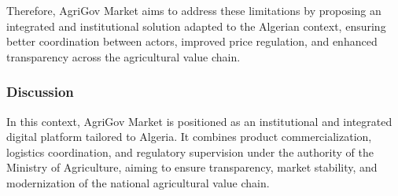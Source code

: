 Therefore, AgriGov Market aims to address these limitations by proposing an integrated and institutional solution adapted to the Algerian context, ensuring better coordination between actors, improved price regulation, and enhanced transparency across the agricultural value chain.

\subsubsection{Discussion}

In this context, AgriGov Market is positioned as an institutional and integrated digital platform tailored to Algeria. It combines product commercialization, logistics coordination, and regulatory supervision under the authority of the Ministry of Agriculture, aiming to ensure transparency, market stability, and modernization of the national agricultural value chain.




